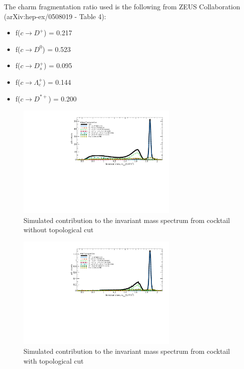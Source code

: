 \documentclass[a4paper]{article}
\begin{document}
The charm fragmentation ratio used is the following from ZEUS Collaboration (arXiv:hep-ex/0508019 - Table 4):

\begin{itemize}
\item f($c \rightarrow D^+$) = 0.217 
\item f($c \rightarrow D^0$) = 0.523 
\item f($c \rightarrow D^+_s$) = 0.095
\item f($c \rightarrow \Lambda^+_c$) = 0.144
\item f($c \rightarrow D^{*+}$) = 0.200
\end{itemize}

\begin{figure}[htbp]
\centering
\includegraphics[keepaspectratio,width=0.7\textwidth,angle=0]{fig/D0Bump_without_topo.pdf}
\caption{Simulated contribution to the invariant mass spectrum from cocktail without topological cut}
\label{fig:cocktail1}
\end{figure}

\begin{figure}[htbp]
\centering
\includegraphics[keepaspectratio,width=0.7\textwidth,angle=0]{fig/D0Bump_with_topo.pdf}
\caption{Simulated contribution to the invariant mass spectrum from cocktail with topological cut}
\label{fig:cocktail2}
\end{figure}
\end{document}
